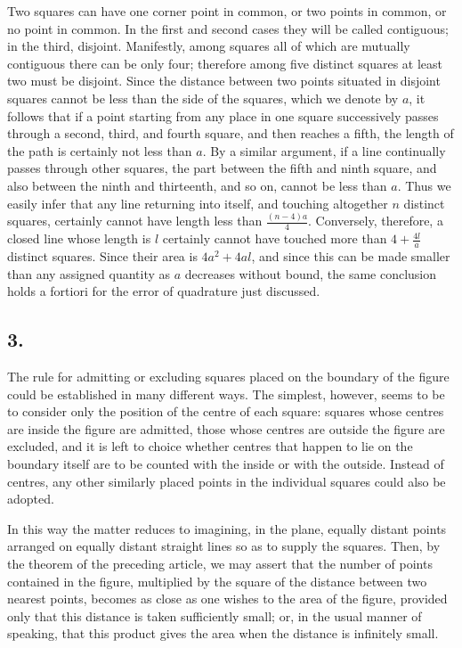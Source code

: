 \documentclass[12pt]{article}
\begin{document}
Two squares can have one corner point in common, or two points in common, or no point in common. In the first and second cases they will be called contiguous; in the third, disjoint. Manifestly, among squares all of which are mutually contiguous there can be only four; therefore among five distinct squares at least two must be disjoint. Since the distance between two points situated in disjoint squares cannot be less than the side of the squares, which we denote by $a$, it follows that if a point starting from any place in one square successively passes through a second, third, and fourth square, and then reaches a fifth, the length of the path is certainly not less than $a$. By a similar argument, if a line continually passes through other squares, the part between the fifth and ninth square, and also between the ninth and thirteenth, and so on, cannot be less than $a$. Thus we easily infer that any line returning into itself, and touching altogether $n$ distinct squares, certainly cannot have length less than $\frac{(n-4)a}{4}$. Conversely, therefore, a closed line whose length is $l$ certainly cannot have touched more than $4+\frac{4l}{a}$ distinct squares. Since their area is $4a^2+4al$, and since this can be made smaller than any assigned quantity as $a$ decreases without bound, the same conclusion holds a fortiori for the error of quadrature just discussed.

\subsection*{3.}

The rule for admitting or excluding squares placed on the boundary of the figure could be established in many different ways. The simplest, however, seems to be to consider only the position of the centre of each square: squares whose centres are inside the figure are admitted, those whose centres are outside the figure are excluded, and it is left to choice whether centres that happen to lie on the boundary itself are to be counted with the inside or with the outside. Instead of centres, any other similarly placed points in the individual squares could also be adopted.

In this way the matter reduces to imagining, in the plane, equally distant points arranged on equally distant straight lines so as to supply the squares. Then, by the theorem of the preceding article, we may assert that the number of points contained in the figure, multiplied by the square of the distance between two nearest points, becomes as close as one wishes to the area of the figure, provided only that this distance is taken sufficiently small; or, in the usual manner of speaking, that this product gives the area when the distance is infinitely small.
\end{document}
